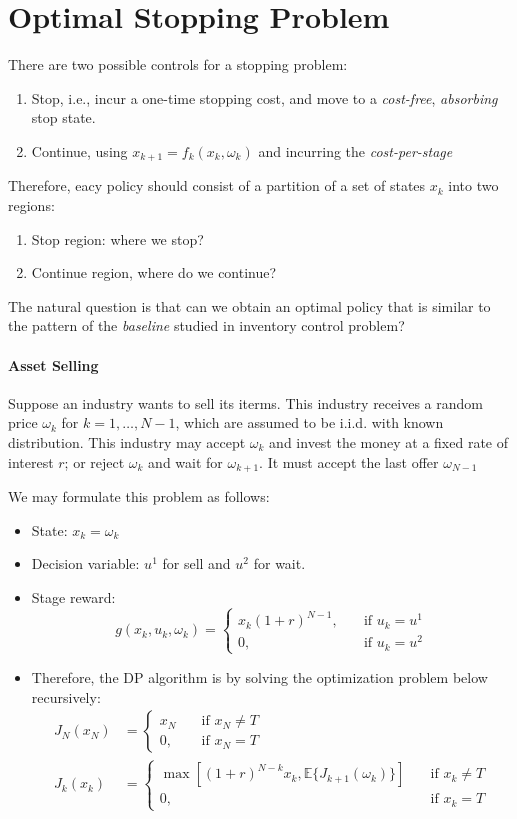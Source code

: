 \section{Optimal Stopping Problem}
There are two possible controls for a stopping problem:
\begin{enumerate}
\item
Stop, i.e., incur a one-time stopping cost, and move to a \emph{cost-free}, \emph{absorbing} stop state.
\item
Continue, using $x_{k+1} = f_k(x_k,\omega_k)$ and incurring the \emph{cost-per-stage}
\end{enumerate}
Therefore, eacy policy should consist of a partition of a set of states $x_k$ into two regions:
\begin{enumerate}
\item
Stop region: where we stop?
\item
Continue region, where do we continue?
\end{enumerate}
The natural question is that can we obtain an optimal policy that is similar to the pattern of the \emph{baseline} studied in inventory control problem?




\paragraph{Asset Selling}
Suppose an industry wants to sell its iterms.
This industry receives a random price $\omega_k$ for $k=1,\dots,N-1$, which are assumed to be i.i.d. with known distribution. This industry may accept $\omega_k$ and invest the money at a fixed rate of interest $r$; or reject $\omega_k$ and wait for $\omega_{k+1}$. It must accept the last offer $\omega_{N-1}$

We may formulate this problem as follows:
\begin{itemize}
\item
State: $x_k=\omega_k$
\item
Decision variable: $u^1$ for sell and $u^2$ for wait.
\item
Stage reward:
\[
g(x_k,u_k,\omega_k)=\left\{
\begin{aligned}
x_k(1+r)^{N-1},\quad&\text{if }u_k=u^1\\
0,\quad &\text{if }u_k = u^2
\end{aligned}
\right.
\]
\item
Therefore, the DP algorithm is by solving the optimization problem below recursively:
\begin{align*}
J_N(x_N)&=\left\{
\begin{aligned}
x_N&\quad\text{if $x_N\ne T$}\\
0,&\quad\text{if $x_N=T$}
\end{aligned}
\right.\\
J_k(x_k)&=
\left\{
\begin{aligned}
\max\left[(1+r)^{N-k}x_k,\mathbb{E}\{J_{k+1}(\omega_k)\}\right]&\quad\text{if $x_k\ne T$}\\
0,&\quad\text{if $x_k=T$}
\end{aligned}
\right.
\end{align*}
\end{itemize}

